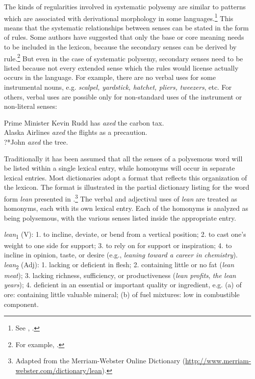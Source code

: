 The kinds of regularities involved in systematic polysemy are similar to patterns which are associated with derivational morphology in some languages.\footnote{See \citet{Apresjan1974}, \citet[ch. 5]{AronoffFudeman2011}.} This means that the systematic relationships between senses can be stated in the form of rules. Some authors have suggested that only the base or core meaning needs to be included in the lexicon, because the secondary senses can be derived by rule.\footnote{For example, \citet{Pustejovsky1995}.} But even in the case of systematic polysemy, secondary senses need to be listed because not every extended sense which the rules would license actually occurs in the language. For example, there are no verbal uses for some instrumental nouns, e.g. \textit{scalpel, yardstick, hatchet, pliers, tweezers}, etc. For others, verbal uses are possible only for non-standard uses of the instrument or non-literal senses:


\ea \label{ex:5.14}
 Prime Minister Kevin Rudd has \textit{axed} the carbon tax.\\
\ex Alaska Airlines \textit{axed} the flights as a precaution.\\
\ex ?*John \textit{axed} the tree.
\z \z


Traditionally it has been assumed that all the senses of a polysemous word will be listed within a single lexical entry, while homonyms will occur in separate lexical entries. Most dictionaries adopt a format that reflects this organization of the lexicon. The format is illustrated in the partial dictionary listing for the word form \textit{lean} presented in .\footnote{Adapted from the Merriam-Webster Online Dictionary (\url{http://www.merriam-webster.com/dictionary/lean}).} The verbal and adjectival uses of \textit{lean} are treated as homonyms, each with its own lexical entry. Each of the homonyms is analyzed as being polysemous, with the various senses listed inside the appropriate entry.


\ea \label{ex:5.15}
\textit{lean}\textsubscript{1} (V): 1. to incline, deviate, or bend from a vertical position; 2. to cast one’s weight to one side for support; 3. to rely on for support or inspiration; 4. to incline in opinion, taste, or desire (e.g., \textit{leaning toward a career in chemistry}).\\[1.25\baselineskip]

\textit{lean}\textsubscript{2} (Adj): 1. lacking or deficient in flesh; 2. containing little or no fat (\textit{lean meat}); 3. lacking richness, sufficiency, or productiveness (\textit{lean profits}, \textit{the lean years}); 4. deficient in an essential or important quality or ingredient, e.g. (a) of ore: containing little valuable mineral; (b) of fuel mixtures: low in combustible component.
\z


